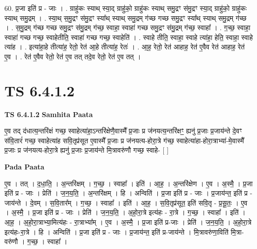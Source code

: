 \documentclass[17pt]{extarticle}
\begin{document}
60. प्र॒जा इति॑ प्र - जाः । . ग्राहु॑कः स्याथ् स्या॒द् ग्राहु॑को॒ ग्राहु॑कः स्याथ् समु॒द्रꣳ स॑मु॒द्रꣳ स्या॒द् ग्राहु॑को॒ ग्राहु॑कः स्याथ् समु॒द्रम् । . स्या॒थ् स॒मु॒द्रꣳ स॑मु॒द्रꣳ स्या᳚थ् स्याथ् समु॒द्रम् ग॑च्छ गच्छ समु॒द्रꣳ स्या᳚थ् स्याथ् समु॒द्रम् ग॑च्छ । . स॒मु॒द्रम् ग॑च्छ गच्छ समु॒द्रꣳ स॑मु॒द्रम् ग॑च्छ॒ स्वाहा॒ स्वाहा॑ गच्छ समु॒द्रꣳ स॑मु॒द्रम् ग॑च्छ॒ स्वाहा᳚ । . ग॒च्छ॒ स्वाहा॒ स्वाहा॑ गच्छ गच्छ॒ स्वाहेतीति॒ स्वाहा॑ गच्छ गच्छ॒ स्वाहेति॑ । . स्वाहे तीति॒ स्वाहा॒ स्वाहे त्या॑हा॒ हेति॒ स्वाहा॒ स्वाहे त्या॑ह । . इत्या॑हा॒हे तीत्या॑ह॒ रेतो॒ रेत॑ आ॒हे तीत्या॑ह॒ रेतः॑ । . आ॒ह॒ रेतो॒ रेत॑ आहाह॒ रेत॑ ए॒वैव रेत॑ आहाह॒ रेत॑ ए॒व । . रेत॑ ए॒वैव रेतो॒ रेत॑ ए॒व तत् तदे॒व रेतो॒ रेत॑ ए॒व तत् । \newline
\pagebreak
{}

\section{ TS 6.4.1.2 }

\textbf{TS 6.4.1.2 } \newline
\textbf{Samhita Paata} \newline

ए॒व तद् द॑धात्य॒न्तरि॑क्षं गच्छ॒ स्वाहेत्या॑हा॒ऽन्तरि॑क्षेणै॒वास्मै᳚ प्र॒जाः प्र ज॑नयत्य॒न्तरि॑क्षꣳ॒॒ ह्यनु॑ प्र॒जाः प्र॒जाय॑न्ते दे॒वꣳ स॑वि॒तारं॑ गच्छ॒ स्वाहेत्या॑ह सवि॒तृप्र॑सूत ए॒वास्मै᳚ प्र॒जाः प्र ज॑नयत्य-होरा॒त्रे ग॑च्छ॒ स्वाहेत्या॑हा-होरा॒त्राभ्या॑-मे॒वास्मै᳚ प्र॒जाः प्र ज॑नयत्य-होरा॒त्रे ह्यनु॑ प्र॒जाः प्र॒जाय॑न्ते मि॒त्रावरु॑णौ गच्छ॒ स्वाहे- [  ] \newline

\textbf{Pada Paata} \newline

ए॒व । तत् । द॒धा॒ति॒ । अ॒न्तरि॑क्षम् । ग॒च्छ॒ । स्वाहा᳚ । इति॑ । आ॒ह॒ । अ॒न्तरि॑क्षेण । ए॒व । अ॒स्मै॒ । प्र॒जा इति॑ प्र - जाः । प्रेति॑ । ज॒न॒य॒ति॒ । अ॒न्तरि॑क्षम् । हि । अन्विति॑ । प्र॒जा इति॑ प्र - जाः । प्र॒जाय॑न्त॒ इति॑ प्र - जाय॑न्ते । दे॒वम् । स॒वि॒तार᳚म् । ग॒च्छ॒ । स्वाहा᳚ । इति॑ । आ॒ह॒ । स॒वि॒तृप्र॑सूत॒ इति॑ सवि॒तृ - प्र॒सू॒तः॒ । ए॒व । अ॒स्मै॒ । प्र॒जा इति॑ प्र - जाः । प्रेति॑ । ज॒न॒य॒ति॒ । अ॒हो॒रा॒त्रे इत्य॑हः - रा॒त्रे । ग॒च्छ॒ । स्वाहा᳚ । इति॑ । आ॒ह॒ । अ॒हो॒रा॒त्राभ्या॒मित्य॑हः - रा॒त्राभ्या᳚म् । ए॒व । अ॒स्मै॒ । प्र॒जा इति॑ प्र-जाः । प्रेति॑ । ज॒न॒य॒ति॒ । अ॒हो॒रा॒त्रे इत्य॑हः-रा॒त्रे । हि । अन्विति॑ । प्र॒जा इति॑ प्र - जाः । प्र॒जाय॑न्त॒ इति॑ प्र-जाय॑न्ते । मि॒त्रावरु॑णा॒विति॑ मि॒त्रा-वरु॑णौ । ग॒च्छ॒ । स्वाहा᳚ ।  \newline
\end{document}
